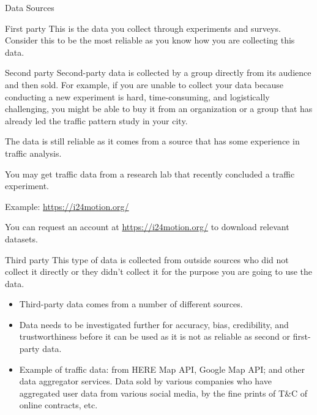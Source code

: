 \documentclass[aspectratio=169,xcolor=dvipsnames,svgnames,x11names,fleqn]{beamer}
\begin{document}
\begin{frame}[allowframebreaks]{Data Sources}

\begin{gradblock}{First party}
    This is the data you collect through experiments and surveys. Consider this to be the most reliable as you know how you are collecting this data.
\end{gradblock}

\begin{gradbox}{Second party}
    Second-party data is collected by a group directly from its audience and then sold. For example, if you are unable to collect your data because conducting a new experiment is hard, time-consuming, and logistically challenging, you might be able to buy it from an organization or a group that has already led the traffic pattern study in your city.

    The data is still reliable as it comes from a source that has some experience in traffic analysis.

    You may get traffic data from a research lab that recently concluded a traffic experiment. 

    Example: {\color{red}\url{https://i24motion.org/}}

    You can request an account at {\color{red}\url{https://i24motion.org/}} to download relevant datasets.
\end{gradbox}

\begin{facts}{Third party}
This type of data is collected from outside sources who did not collect it directly or they didn't collect it for the purpose you are going to use the data.

\begin{itemize}
    \item Third-party data comes from a number of different sources.
    \item Data needs to be investigated further for accuracy, bias, credibility, and trustworthiness before it can be used as it is not as reliable as second or first-party data.
    \item Example of traffic data: from HERE Map API, Google Map API; and other data aggregator services. Data sold by various companies who have aggregated user data from various social media, by the fine prints of T\&C of online contracts, etc.
\end{itemize}
    
\end{facts}
\end{frame}
\end{document}
